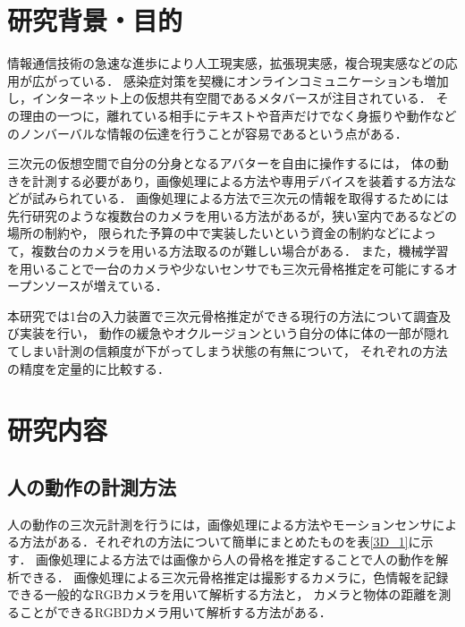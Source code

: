 \documentclass[titlepage]{jarticle}
\begin{document}
\maketitle

%
%
\section{研究背景・目的}
%
情報通信技術の急速な進歩により人工現実感，拡張現実感，複合現実感などの応用が広がっている．
感染症対策を契機にオンラインコミュニケーションも増加し，インターネット上の仮想共有空間であるメタバースが注目されている\cite{meta}．
その理由の一つに，離れている相手にテキストや音声だけでなく身振りや動作などのノンバーバルな情報の伝達を行うことが容易であるという点がある．

三次元の仮想空間で自分の分身となるアバターを自由に操作するには，
体の動きを計測する必要があり，画像処理による方法\cite{CV}や専用デバイスを装着する方法\cite{キャプチャ}などが試みられている．
画像処理による方法で三次元の情報を取得するためには先行研究のような複数台のカメラを用いる方法\cite{turugi}があるが，狭い室内であるなどの場所の制約や，
限られた予算の中で実装したいという資金の制約などによって，複数台のカメラを用いる方法取るのが難しい場合がある．
また，機械学習を用いることで一台のカメラや少ないセンサでも三次元骨格推定を可能にするオープンソースが増えている．

本研究では1台の入力装置で三次元骨格推定ができる現行の方法について調査及び実装を行い， %
動作の緩急やオクルージョンという自分の体に体の一部が隠れてしまい計測の信頼度が下がってしまう状態の有無について，
それぞれの方法の精度を定量的に比較する．
%
\section{研究内容}

%
%
\subsection{人の動作の計測方法}
%
人の動作の三次元計測を行うには，画像処理による方法やモーションセンサによる方法がある．それぞれの方法について簡単にまとめたものを表\ref{3D_1}に示す．
画像処理による方法では画像から人の骨格を推定することで人の動作を解析できる．
画像処理による三次元骨格推定は撮影するカメラに，色情報を記録できる一般的なRGBカメラを用いて解析する方法と，
カメラと物体の距離を測ることができるRGBDカメラ用いて解析する方法がある．
\end{document}

